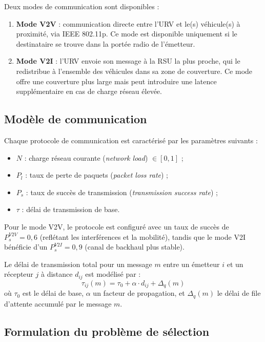 \documentclass[12pt,a4paper]{article}
\begin{document}
Deux modes de communication sont disponibles :
\begin{enumerate}
  \item \textbf{Mode V2V} : communication directe entre l'URV et le(s) véhicule(s)
        à proximité, via IEEE 802.11p. Ce mode est disponible uniquement si le
        destinataire se trouve dans la portée radio de l'émetteur.
  \item \textbf{Mode V2I} : l'URV envoie son message à la RSU la plus proche, qui
        le redistribue à l'ensemble des véhicules dans sa zone de couverture.
        Ce mode offre une couverture plus large mais peut introduire une latence
        supplémentaire en cas de charge réseau élevée.
\end{enumerate}

\subsection{Modèle de communication}

Chaque protocole de communication est caractérisé par les paramètres suivants :
\begin{itemize}[leftmargin=*]
  \item $N$ : charge réseau courante (\textit{network load}) $\in [0, 1]$ ;
  \item $P_l$ : taux de perte de paquets (\textit{packet loss rate}) ;
  \item $P_s$ : taux de succès de transmission (\textit{transmission success rate}) ;
  \item $\tau$ : délai de transmission de base.
\end{itemize}

Pour le mode V2V, le protocole est configuré avec un taux de succès de $P_s^{V2V}
= 0{,}6$ (reflétant les interférences et la mobilité), tandis que le mode V2I
bénéficie d'un $P_s^{V2I} = 0{,}9$ (canal de backhaul plus stable).

Le délai de transmission total pour un message $m$ entre un émetteur $i$ et un
récepteur $j$ à distance $d_{ij}$ est modélisé par :
\begin{equation}
  \tau_{ij}(m) = \tau_0 + \alpha \cdot d_{ij} + \Delta_q(m)
\end{equation}
où $\tau_0$ est le délai de base, $\alpha$ un facteur de propagation, et
$\Delta_q(m)$ le délai de file d'attente accumulé par le message $m$.

\subsection{Formulation du problème de sélection}
\end{document}
